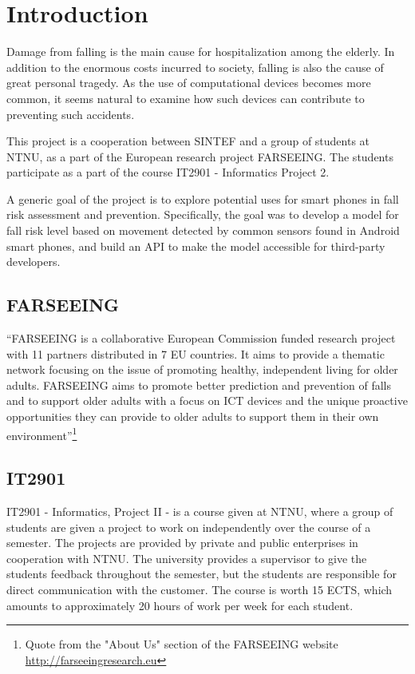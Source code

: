 \chapter{Introduction}

Damage from falling is the main cause for hospitalization among the elderly. In addition to the enormous costs incurred to society, falling is also the cause of great personal tragedy. As the use of computational devices becomes more common, it seems natural to examine how such devices can contribute to preventing such accidents.

This project is a cooperation between SINTEF and a group of students at NTNU, as a part of the European research project FARSEEING. The students participate as a part of the course IT2901 - Informatics Project 2.

A generic goal of the project is to explore potential uses for smart phones in fall risk assessment and prevention. Specifically, the goal was to develop a model for fall risk level based on movement detected by common sensors found in Android smart phones, and build an API to make the model accessible for third-party developers.

\section{FARSEEING}
``FARSEEING is a collaborative European Commission funded research project with 11 partners distributed in 7 EU countries. It aims to provide a thematic network focusing on the issue of promoting healthy, independent living for older adults. FARSEEING aims to promote better prediction and prevention of falls and to support older adults with a focus on ICT devices and the unique proactive opportunities they can provide to older adults to support them in their own environment''\footnote{Quote from the "About Us" section of the FARSEEING website \url{http://farseeingresearch.eu}}

\section{IT2901}
IT2901 - Informatics, Project II - is a course given at NTNU, where a group of students are given a project to work on independently over the course of a semester. The projects are provided by private and public enterprises in cooperation with NTNU. The university provides a supervisor to give the students feedback throughout the semester, but the students are responsible for direct communication with the customer. The course is worth 15 ECTS, which amounts to approximately 20 hours of work per week for each student. 

